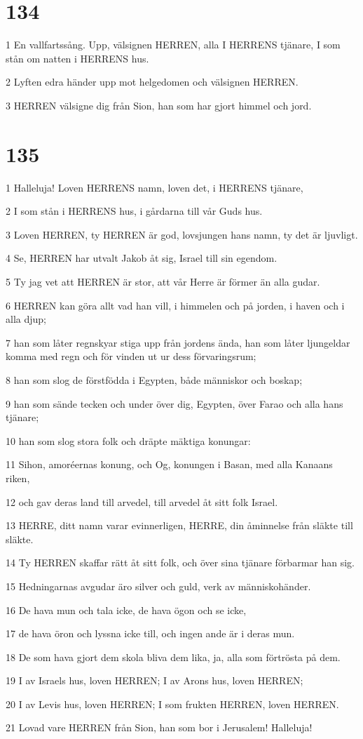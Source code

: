 \chapter{134}

\par 1 En vallfartssång. Upp, välsignen HERREN, alla I HERRENS tjänare, I som stån om natten i HERRENS hus.
\par 2 Lyften edra händer upp mot helgedomen och välsignen HERREN.
\par 3 HERREN välsigne dig från Sion, han som har gjort himmel och jord.

\chapter{135}

\par 1 Halleluja! Loven HERRENS namn, loven det, i HERRENS tjänare,
\par 2 I som stån i HERRENS hus, i gårdarna till vår Guds hus.
\par 3 Loven HERREN, ty HERREN är god, lovsjungen hans namn, ty det är ljuvligt.
\par 4 Se, HERREN har utvalt Jakob åt sig, Israel till sin egendom.
\par 5 Ty jag vet att HERREN är stor, att vår Herre är förmer än alla gudar.
\par 6 HERREN kan göra allt vad han vill, i himmelen och på jorden, i haven och i alla djup;
\par 7 han som låter regnskyar stiga upp från jordens ända, han som låter ljungeldar komma med regn och för vinden ut ur dess förvaringsrum;
\par 8 han som slog de förstfödda i Egypten, både människor och boskap;
\par 9 han som sände tecken och under över dig, Egypten, över Farao och alla hans tjänare;
\par 10 han som slog stora folk och dräpte mäktiga konungar:
\par 11 Sihon, amoréernas konung, och Og, konungen i Basan, med alla Kanaans riken,
\par 12 och gav deras land till arvedel, till arvedel åt sitt folk Israel.
\par 13 HERRE, ditt namn varar evinnerligen, HERRE, din åminnelse från släkte till släkte.
\par 14 Ty HERREN skaffar rätt åt sitt folk, och över sina tjänare förbarmar han sig.
\par 15 Hedningarnas avgudar äro silver och guld, verk av människohänder.
\par 16 De hava mun och tala icke, de hava ögon och se icke,
\par 17 de hava öron och lyssna icke till, och ingen ande är i deras mun.
\par 18 De som hava gjort dem skola bliva dem lika, ja, alla som förtrösta på dem.
\par 19 I av Israels hus, loven HERREN; I av Arons hus, loven HERREN;
\par 20 I av Levis hus, loven HERREN; I som frukten HERREN, loven HERREN.
\par 21 Lovad vare HERREN från Sion, han som bor i Jerusalem! Halleluja!

